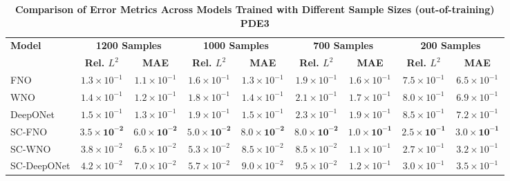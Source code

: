 \begin{table}[htbp]
\centering
\caption{\scriptsize\textbf{Comparison of Error Metrics Across Models Trained with Different Sample Sizes (out-of-training) PDE3}}
\label{tab:pde3_forward_ood}
\scriptsize
\setlength{\tabcolsep}{3pt}
\begin{tabular}{lcccccccc}
\hline
\textbf{Model} & \multicolumn{2}{c}{\textbf{1200 Samples}} & \multicolumn{2}{c}{\textbf{1000 Samples}} & \multicolumn{2}{c}{\textbf{700 Samples}} & \multicolumn{2}{c}{\textbf{200 Samples}} \\
 & \textbf{Rel. \(L^2\)} & \textbf{MAE} & \textbf{Rel. \(L^2\)} & \textbf{MAE} & \textbf{Rel. \(L^2\)} & \textbf{MAE} & \textbf{Rel. \(L^2\)} & \textbf{MAE} \\
\hline
FNO        & \(1.3 \times 10^{-1}\) & \(1.1 \times 10^{-1}\) & \(1.6 \times 10^{-1}\) & \(1.3 \times 10^{-1}\) & \(1.9 \times 10^{-1}\) & \(1.6 \times 10^{-1}\) & \(7.5 \times 10^{-1}\) & \(6.5 \times 10^{-1}\) \\
WNO        & \(1.4 \times 10^{-1}\) & \(1.2 \times 10^{-1}\) & \(1.8 \times 10^{-1}\) & \(1.4 \times 10^{-1}\) & \(2.1 \times 10^{-1}\) & \(1.7 \times 10^{-1}\) & \(8.0 \times 10^{-1}\) & \(6.9 \times 10^{-1}\) \\
DeepONet   & \(1.5 \times 10^{-1}\) & \(1.3 \times 10^{-1}\) & \(1.9 \times 10^{-1}\) & \(1.5 \times 10^{-1}\) & \(2.3 \times 10^{-1}\) & \(1.9 \times 10^{-1}\) & \(8.5 \times 10^{-1}\) & \(7.2 \times 10^{-1}\) \\
SC-FNO     & \(\mathbf{3.5 \times 10^{-2}}\) & \(\mathbf{6.0 \times 10^{-2}}\) & \(\mathbf{5.0 \times 10^{-2}}\) & \(\mathbf{8.0 \times 10^{-2}}\) & \(\mathbf{8.0 \times 10^{-2}}\) & \(\mathbf{1.0 \times 10^{-1}}\) & \(\mathbf{2.5 \times 10^{-1}}\) & \(\mathbf{3.0 \times 10^{-1}}\) \\
SC-WNO     & \(3.8 \times 10^{-2}\) & \(6.5 \times 10^{-2}\) & \(5.3 \times 10^{-2}\) & \(8.5 \times 10^{-2}\) & \(8.5 \times 10^{-2}\) & \(1.1 \times 10^{-1}\) & \(2.7 \times 10^{-1}\) & \(3.2 \times 10^{-1}\) \\
SC-DeepONet& \(4.2 \times 10^{-2}\) & \(7.0 \times 10^{-2}\) & \(5.7 \times 10^{-2}\) & \(9.0 \times 10^{-2}\) & \(9.5 \times 10^{-2}\) & \(1.2 \times 10^{-1}\) & \(3.0 \times 10^{-1}\) & \(3.5 \times 10^{-1}\) \\
\hline
\end{tabular}
\end{table}
